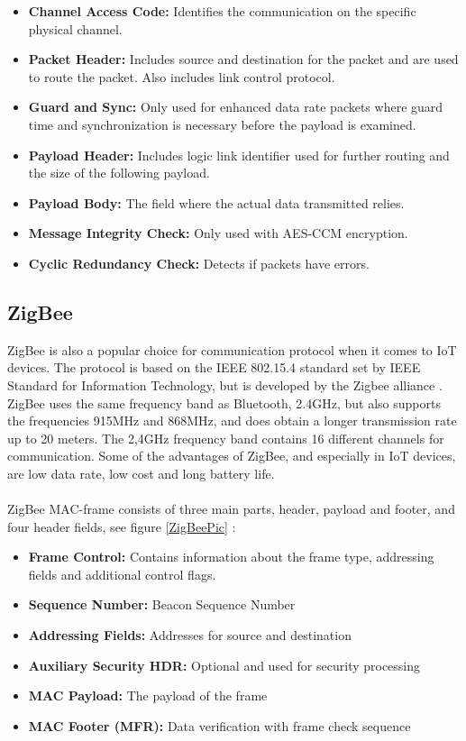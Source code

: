 \begin{itemize}
    \item \textbf{Channel Access Code:} Identifies the communication on the specific physical channel. 
    \item \textbf{Packet Header:} Includes source and destination for the packet and are used to route the packet. Also includes link control protocol. 
    \item \textbf{Guard and Sync:} Only used for enhanced data rate packets where guard time and synchronization is necessary before the payload is examined.
    \item \textbf{Payload Header:} Includes logic link identifier used for further routing and the size of the following payload.
    \item \textbf{Payload Body:} The field where the actual data transmitted relies. 
    \item \textbf{Message Integrity Check:} Only used with AES-CCM encryption.
    \item \textbf{Cyclic Redundancy Check:} Detects if packets have errors. 
\end{itemize}


\subsection{ZigBee}
ZigBee is also a popular choice for communication protocol when it comes to IoT devices. The protocol is based on the IEEE 802.15.4 standard set by IEEE Standard for Information Technology, but is developed by the Zigbee alliance \cite{ZigBeeStandard} \cite{ZigbeeAlliance}. ZigBee uses the same frequency band as Bluetooth, 2.4GHz, but also supports the frequencies 915MHz and 868MHz, and does obtain a longer transmission rate up to 20 meters. \cite{IAQMonitorCommunicationReview} The 2,4GHz frequency band contains 16 different channels for communication. \cite{ZigbeeOverview} Some of the advantages of ZigBee, and especially in IoT devices, are low data rate, low cost and long battery life. 
\\\\
ZigBee MAC-frame consists of three main parts, header, payload and footer, and four header fields, see figure \ref{ZigBeePic} \cite{ZigBeBasics}:
\begin{itemize}
    \item \textbf{Frame Control:} Contains information about the frame type, addressing fields and additional control flags.
    \item \textbf{Sequence Number:} Beacon Sequence Number
    \item \textbf{Addressing Fields:} Addresses for source and destination
    \item \textbf{Auxiliary Security HDR:} Optional and used for security processing
    \item \textbf{MAC Payload:}  The payload of the frame
    \item \textbf{MAC Footer (MFR):} Data verification with frame check sequence
\end{itemize}

